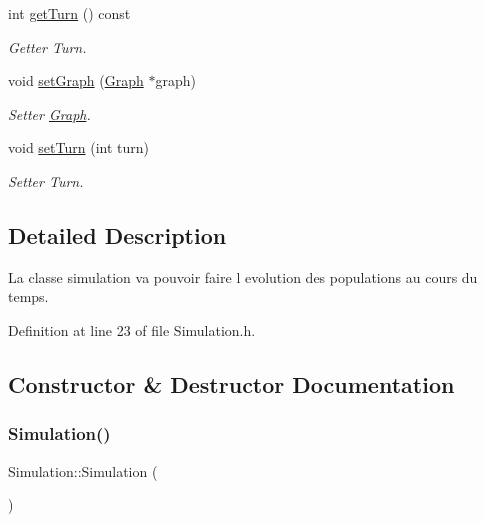 \begin{DoxyCompactItemize}
int \mbox{\hyperlink{class_simulation_a21dc3e8afd771b9bfa58f88fdce1c998}{get\+Turn}} () const
\begin{DoxyCompactList}\small\item\em Getter Turn. \end{DoxyCompactList}\item 
void \mbox{\hyperlink{class_simulation_a72ce1eb4046e69378685ea0c46cc8448}{set\+Graph}} (\mbox{\hyperlink{class_graph}{Graph}} $\ast$graph)
\begin{DoxyCompactList}\small\item\em Setter \mbox{\hyperlink{class_graph}{Graph}}. \end{DoxyCompactList}\item 
void \mbox{\hyperlink{class_simulation_a0929f56d21b2e607e0dda8c7b9c97092}{set\+Turn}} (int turn)
\begin{DoxyCompactList}\small\item\em Setter Turn. \end{DoxyCompactList}\end{DoxyCompactItemize}


\subsection{Detailed Description}
La classe simulation va pouvoir faire l evolution des populations au cours du temps. 

Definition at line 23 of file Simulation.\+h.



\subsection{Constructor \& Destructor Documentation}
\mbox{\label{class_simulation_a5b224cc5b36bcc8eb29689aff223de41}} 
\subsubsection{\texorpdfstring{Simulation()}{Simulation()}\hspace{0.1cm}{\footnotesize\ttfamily [1/2]}}
{\footnotesize\ttfamily Simulation\+::\+Simulation (\begin{DoxyParamCaption}{ }\end{DoxyParamCaption})}



